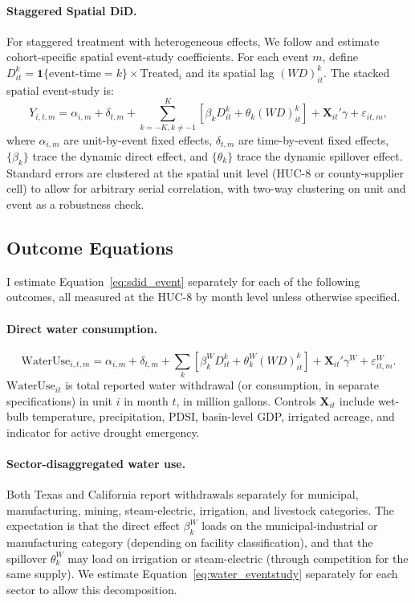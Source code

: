 \documentclass[11pt, letterpaper]{article}
\begin{document}
\paragraph{Staggered Spatial DiD.} For staggered treatment with heterogeneous effects, We follow \citet{butts2023did} and estimate cohort-specific spatial event-study coefficients. For each event $m$, define $D_{it}^k = \mathbf{1}\{\text{event-time}=k\}\times \text{Treated}_i$ and its spatial lag $(WD)_{it}^k$. The stacked spatial event-study is:
\begin{equation}
Y_{i,t,m} = \alpha_{i,m} + \delta_{t,m} + \sum_{k=-K, k \neq -1}^{K} \left[\beta_k D_{it}^k + \theta_k (WD)_{it}^k\right] + \mathbf{X}_{it}'\gamma + \varepsilon_{it,m},
\label{eq:sdid_event}
\end{equation}
where $\alpha_{i,m}$ are unit-by-event fixed effects, $\delta_{t,m}$ are time-by-event fixed effects, $\{\beta_k\}$ trace the dynamic direct effect, and $\{\theta_k\}$ trace the dynamic spillover effect. Standard errors are clustered at the spatial unit level (HUC-8 or county-supplier cell) to allow for arbitrary serial correlation, with two-way clustering on unit and event as a robustness check.

\subsection{Outcome Equations}
\label{sec:outcomes}

I estimate Equation~\eqref{eq:sdid_event} separately for each of the following outcomes, all measured at the HUC-8 by month level unless otherwise specified.

\paragraph{Direct water consumption.}
\begin{equation}
\text{WaterUse}_{i,t,m} = \alpha_{i,m} + \delta_{t,m} + \sum_{k} \left[\beta_k^{W} D_{it}^k + \theta_k^{W} (WD)_{it}^k\right] + \mathbf{X}_{it}'\gamma^{W} + \varepsilon^{W}_{it,m}.
\label{eq:water_eventstudy}
\end{equation}
$\text{WaterUse}_{it}$ is total reported water withdrawal (or consumption, in separate specifications) in unit $i$ in month $t$, in million gallons. Controls $\mathbf{X}_{it}$ include wet-bulb temperature, precipitation, PDSI, basin-level GDP, irrigated acreage, and indicator for active drought emergency.

\paragraph{Sector-disaggregated water use.} Both Texas and California report withdrawals separately for municipal, manufacturing, mining, steam-electric, irrigation, and livestock categories. The expectation is that the direct effect $\beta_k^W$ loads on the municipal-industrial or manufacturing category (depending on facility classification), and that the spillover $\theta_k^W$ may load on irrigation or steam-electric (through competition for the same supply). We estimate Equation~\eqref{eq:water_eventstudy} separately for each sector to allow this decomposition.
\end{document}
